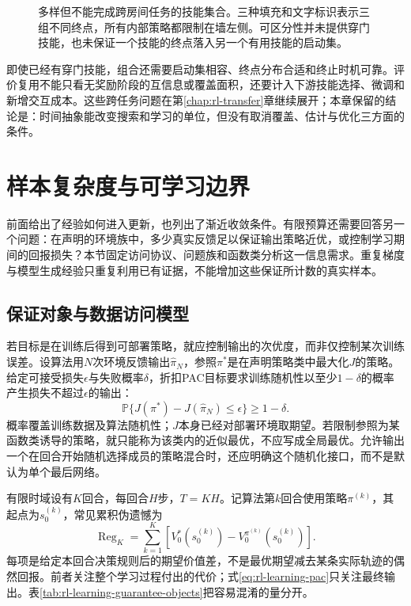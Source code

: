 \begin{figure}[t]
  \centering
  
  \caption{多样但不能完成跨房间任务的技能集合。三种填充和文字标识表示三组不同终点，所有内部策略都限制在墙左侧。可区分性并未提供穿门技能，也未保证一个技能的终点落入另一个有用技能的启动集。}
  \label{fig:rl-learning-skill-regions}
\end{figure}

即使已经有穿门技能，组合还需要启动集相容、终点分布合适和终止时机可靠。评价复用不能只看无奖励阶段的互信息或覆盖面积，还要计入下游技能选择、微调和新增交互成本。这些跨任务问题在第\ref{chap:rl-transfer}章继续展开；本章保留的结论是：时间抽象能改变搜索和学习的单位，但没有取消覆盖、估计与优化三方面的条件。

\section{样本复杂度与可学习边界}
\label{sec:rl-learning-statistical-limits}

前面给出了经验如何进入更新，也列出了渐近收敛条件。有限预算还需要回答另一个问题：在声明的环境族中，多少真实反馈足以保证输出策略近优，或控制学习期间的回报损失？本节固定访问协议、问题族和函数类分析这一信息需求。重复梯度与模型生成经验只重复利用已有证据，不能增加这些保证所计数的真实样本。

\subsection{保证对象与数据访问模型}
\label{sec:rl-learning-guarantees-access}

若目标是在训练后得到可部署策略，就应控制输出的次优度，而非仅控制某次训练误差。设算法用$N$次环境反馈输出$\widehat\pi_N$，参照$\pi^*$是在声明策略类中最大化$J$的策略。给定可接受损失$\epsilon$与失败概率$\delta$，折扣PAC目标要求训练随机性以至少$1-\delta$的概率产生损失不超过$\epsilon$的输出：
\begin{equation}
 \mathbb P\{J(\pi^*)-J(\widehat\pi_N)\leq\epsilon\}
                       \geq1-\delta.
 \label{eq:rl-learning-pac}
\end{equation}
概率覆盖训练数据及算法随机性；$J$本身已经对部署环境取期望。若限制参照为某函数类诱导的策略，就只能称为该类内的近似最优，不应写成全局最优。允许输出一个在回合开始随机选择成员的策略混合时，还应明确这个随机化接口，而不是默认为单个最后网络。

有限时域设有$K$回合，每回合$H$步，$T=KH$。记算法第$k$回合使用策略$\pi^{(k)}$，其起点为$s_0^{(k)}$，常见累积伪遗憾为
\begin{equation}
 \operatorname{Reg}_K
   =\sum_{k=1}^{K}\left[
       V_0^*(s_0^{(k)})-V_0^{\pi^{(k)}}(s_0^{(k)})\right].
 \label{eq:rl-learning-episodic-regret}
\end{equation}
每项是给定本回合决策规则后的期望价值差，不是最优期望减去某条实际轨迹的偶然回报。前者关注整个学习过程付出的代价；式\eqref{eq:rl-learning-pac}只关注最终输出。表\ref{tab:rl-learning-guarantee-objects}把容易混淆的量分开。

